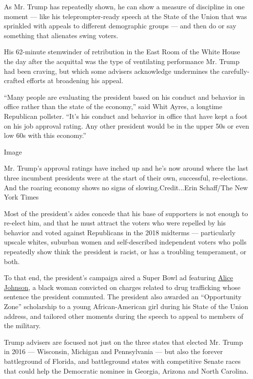 As Mr. Trump has repeatedly shown, he can show a measure of discipline
in one moment --- like his teleprompter-ready speech at the State of the
Union that was sprinkled with appeals to different demographic groups
--- and then do or say something that alienates swing voters.

His 62-minute stemwinder of retribution in the East Room of the White
House the day after the acquittal was the type of ventilating
performance Mr. Trump had been craving, but which some advisers
acknowledge undermines the carefully-crafted efforts at broadening his
appeal.

``Many people are evaluating the president based on his conduct and
behavior in office rather than the state of the economy,'' said Whit
Ayres, a longtime Republican pollster. ``It's his conduct and behavior
in office that have kept a foot on his job approval rating. Any other
president would be in the upper 50s or even low 60s with this economy.''

Image

Mr. Trump's approval ratings have inched up and he's now around where
the last three incumbent presidents were at the start of their own,
successful, re-elections. And the roaring economy shows no signs of
slowing.Credit...Erin Schaff/The New York Times

Most of the president's aides concede that his base of supporters is not
enough to re-elect him, and that he must attract the voters who were
repelled by his behavior and voted against Republicans in the 2018
midterms --- particularly upscale whites, suburban women and
self-described independent voters who polls repeatedly show think the
president is racist, or has a troubling temperament, or both.

To that end, the president's campaign aired a Super Bowl ad featuring
\href{https://www.nytimes3xbfgragh.onion/2020/02/06/us/politics/alice-johnson-trump-super-bowl-ad.html}{Alice
Johnson}, a black woman convicted on charges related to drug trafficking
whose sentence the president commuted. The president also awarded an
``Opportunity Zone'' scholarship to a young African-American girl during
his State of the Union address, and tailored other moments during the
speech to appeal to members of the military.

Trump advisers are focused not just on the three states that elected Mr.
Trump in 2016 --- Wisconsin, Michigan and Pennsylvania --- but also the
forever battleground of Florida, and battleground states with
competitive Senate races that could help the Democratic nominee in
Georgia, Arizona and North Carolina.

